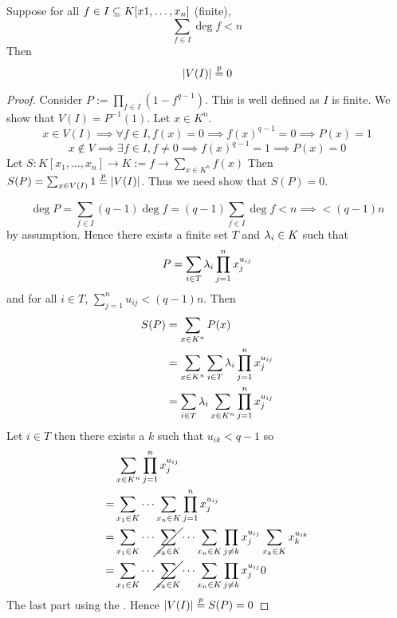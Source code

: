 \begin{prop}[Chevalley]
    Suppose for all $f \in I \subseteq K[x1, \dots , x_n]$ (finite), 
    \[\sum_{f \in I} \deg f < n\]
    Then 
    \[\abs{V(I)} \ontop{p}{=} 0\]
\end{prop}
\begin{proof}
    Consider $P := \prod_{f \in I} (1 - f^{q-1})$.
    This is well defined as $I$ is finite.
    We show that $V(I) = P^{-1} (1)$.
    Let $x \in K^n$.
    \[
        x \in V(I) \implies \forall f \in I, f(x) = 0 
        \implies  {f(x)}^{q - 1} = 0 
        \implies P(x) = 1
    \]
    \[
        x \notin V \implies
        \exists f \in I, f \ne 0
        \implies {f(x)}^{q - 1} = 1
        \implies P(x) = 0
    \]
    Let 
    $S : K[x_1 ,\dots, x_n] \to K := f \to \sum_{x \in K^n} f(x)$
    Then $S(P) = \sum_{x \in V(I)} 1 \ontop{p}{=} \abs{V(I)}$.
    Thus we need show that $S(P) = 0$.

    \[\deg P = \sum_{f \in I} (q - 1)\deg f 
    = (q - 1) \sum_{f \in I} \deg f < n \implies < (q - 1) n\]
    by assumption.
    Hence there exists a finite set $T$ and $\lambda_i \in K$ such that
    \[P = \sum_{i \in T} \lambda_i \prod_{j = 1}^n x_j^{u_{ij}}\]
    and for all $i \in T$, $\sum_{j = 1}^n u_{ij} < (q - 1) n$.
    Then 
    \begin{align}
        S(P) &= \sum_{x \in K^n} P(x)\\
            &= \sum_{x\in K^n} \sum_{i \in T} \lambda_i 
            \prod_{j = 1}^n x_j^{u_{ij}}\\
            &= \sum_{i \in T} \lambda_i \sum_{x\in K^n} 
            \prod_{j = 1}^n x_j^{u_{ij}}\\
    \end{align}
    Let $i \in T$ then there exists a $k$ such that 
    $u_{ik} < q - 1$ so
    \begin{align}
        & \sum_{x\in K^n} \prod_{j = 1}^n x_j^{u_{ij}}\\
        = & \sum_{x_1 \in K} \cdots \sum_{x_n \in K} 
        \prod_{j = 1}^n x_j^{u_{ij}}\\
        = & \sum_{x_1 \in K} \cdots \cancel{\sum_{x_k \in K}} \cdots \sum_{x_n \in K} 
        \prod_{j \ne k} x_j^{u_{ij}} \sum_{x_k \in K} x_k^{u_{ik}}\\
        = & \sum_{x_1 \in K} \cdots \cancel{\sum_{x_k \in K}} \cdots \sum_{x_n \in K} 
        \prod_{j \ne k} x_j^{u_{ij}} 0
    \end{align}
    The last part using the .
    Hence $\abs{V(I)} \ontop{p}{=} S(P) = 0$
\end{proof}

